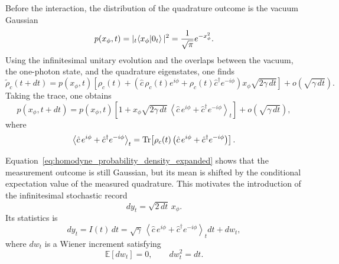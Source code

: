 Before the interaction, the distribution of the quadrature outcome is the vacuum Gaussian
\begin{equation}
	p(x_\phi,t)=|{}_t\!\braket{x_\phi}{0_t}|^2=\frac{1}{\sqrt{\pi}}e^{-x_\phi^2}.
	\label{eq:homodyne_vacuum_quadrature_distribution}
\end{equation}
Using the infinitesimal unitary evolution and the overlaps between the vacuum, the one-photon state, and the quadrature eigenstates, one finds
\begin{equation}
	\tilde{\rho}_c(t+dt)
	=
	p(x_\phi,t)
	\left[
	\rho_c(t)
	+
	\left(
	\hat c\,\rho_c(t)e^{i\phi}
	+
	\rho_c(t)\hat c^\dagger e^{-i\phi}
	\right)
	x_\phi\sqrt{2\gamma\,dt}
	\right]
	+
	o\!\left(\sqrt{\gamma\,dt}\right).
	\label{eq:homodyne_unnormalized_state_expanded}
\end{equation}
Taking the trace, one obtains
\begin{equation}
	p(x_\phi,t+dt)
	=
	p(x_\phi,t)
	\left[
	1
	+
	x_\phi\sqrt{2\gamma\,dt}\,
	\left\langle
	\hat c\,e^{i\phi}+\hat c^\dagger e^{-i\phi}
	\right\rangle_t
	\right]
	+
	o\!\left(\sqrt{\gamma\,dt}\right),
	\label{eq:homodyne_probability_density_expanded}
\end{equation}
where
\begin{equation}
	\left\langle
	\hat c\,e^{i\phi}+\hat c^\dagger e^{-i\phi}
	\right\rangle_t
	=
	\Tr\!\left[
	\rho_c(t)\left(
	\hat c\,e^{i\phi}+\hat c^\dagger e^{-i\phi}
	\right)
	\right].
	\label{eq:homodyne_conditional_quadrature_mean}
\end{equation}

Equation~\eqref{eq:homodyne_probability_density_expanded} shows that the measurement outcome is still Gaussian, but its mean is shifted by the conditional expectation value of the measured quadrature. This motivates the introduction of the infinitesimal stochastic record
\begin{equation}
	dy_t=\sqrt{2\,dt}\,x_\phi.
	\label{eq:homodyne_record_definition}
\end{equation}
Its statistics  is
\begin{equation}
	dy_t
	=
	I(t)\,dt
	=
	\sqrt{\gamma}\,
	\left\langle
	\hat c\,e^{i\phi}+\hat c^\dagger e^{-i\phi}
	\right\rangle_t dt
	+
	dw_t,
	\label{eq:homodyne_record_statistics}
\end{equation}
where \(dw_t\) is a Wiener increment satisfying
\begin{equation}
	\mathbb{E}[dw_t]=0,
	\qquad
	dw_t^2=dt.
	\label{eq:homodyne_wiener_increment}
\end{equation}

